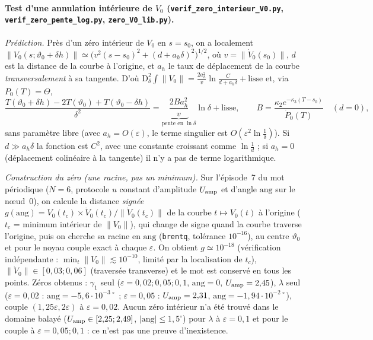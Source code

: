 \documentclass[11pt,a4paper]{article}
\theoremstyle{remark}
\theoremstyle{definition}
\newcommand{\norm}[1]{\lVert #1\rVert}
\newcommand{\eps}{\varepsilon}
\newcommand{\vth}{\vartheta}
\newcommand{\D}{\mathrm D}
\begin{document}
\paragraph{Test d'une annulation intérieure de $V_0$ (\texttt{verif\_zero\_interieur\_V0.py}, \texttt{verif\_zero\_pente\_log.py}, \texttt{zero\_V0\_lib.py}).} \emph{Prédiction.} Près d'un zéro intérieur de $V_0$ en $s=s_0$, on a localement $\norm{V_0(s;\vth_0+\delta h)}\simeq\bigl(v^2(s-s_0)^2+(d+a_h\delta)^2\bigr)^{1/2}$, où $v=\norm{\dot V_0(s_0)}$, $d$ est la distance de la courbe à l'origine, et $a_h$ le taux de déplacement de la courbe \emph{transversalement} à sa tangente. D'où $\D^2_\delta\!\int\!\norm{V_0}=\frac{2a_h^2}{v}\ln\frac{C}{d+a_h\delta}+\text{lisse}$ et, via $P_0(T)=\Theta$,
\[
\frac{T(\vth_0+\delta h)-2T(\vth_0)+T(\vth_0-\delta h)}{\delta^2}=\underbrace{\frac{2Ba_h^2}{v}}_{\text{pente en }\ln\delta}\ln\delta+\text{lisse},\qquad B=\frac{\kappa_2e^{-\kappa_3(T-s_0)}}{\dot P_0(T)}\quad(d=0),
\]
sans paramètre libre (avec $a_h=O(\eps)$, le terme singulier est $O(\eps^2\ln\frac1\delta)$). Si $d\gg a_h\delta$ la fonction est $C^2$, avec une constante croissant comme $\ln\frac1d$ ; si $a_h=0$ (déplacement colinéaire à la tangente) il n'y a pas de terme logarithmique.

\emph{Construction du zéro (une racine, pas un minimum).} Sur l'épisode~7 du mot périodique ($N=6$, protocole $u$ constant d'amplitude $U_{\rm amp}$ et d'angle $\mathrm{ang}$ sur le n\oe ud~$0$), on calcule la distance \emph{signée} $g(\mathrm{ang})=V_0(t_c)\times\dot V_0(t_c)/\norm{\dot V_0(t_c)}$ de la courbe $t\mapsto V_0(t)$ à l'origine ($t_c$ = minimum intérieur de $\norm{V_0}$), qui change de signe quand la courbe traverse l'origine, puis on cherche sa racine en $\mathrm{ang}$ (\texttt{brentq}, tolérance $10^{-16}$), au centre $\vth_0$ et pour le noyau couple exact à chaque $\eps$. On obtient $g\simeq10^{-18}$ (vérification indépendante : $\min_t\norm{V_0}\lesssim10^{-10}$, limité par la localisation de $t_c$), $\norm{\dot V_0}\in[0{,}03;0{,}06]$ (traversée transverse) et le mot est conservé en tous les points. Zéros obtenus : $\gamma_1$ seul ($\eps=0{,}02;0{,}05;0{,}1$, $\mathrm{ang}=0$, $U_{\rm amp}=2{,}45$), $\lambda$ seul ($\eps=0{,}02$ : $\mathrm{ang}=-5{,}6\cdot10^{-3\,\circ}$ ; $\eps=0{,}05$ : $U_{\rm amp}=2{,}31$, $\mathrm{ang}=-1{,}94\cdot10^{-2\,\circ}$), couple $(1{,}25\eps,2\eps)$ à $\eps=0{,}02$. Aucun zéro intérieur n'a été trouvé dans le domaine balayé ($U_{\rm amp}\in[2{,}25;2{,}49]$, $\lvert\mathrm{ang}\rvert\le1{,}5^\circ$) pour $\lambda$ à $\eps=0{,}1$ et pour le couple à $\eps=0{,}05;0{,}1$ : ce n'est pas une preuve d'inexistence.
\end{document}
